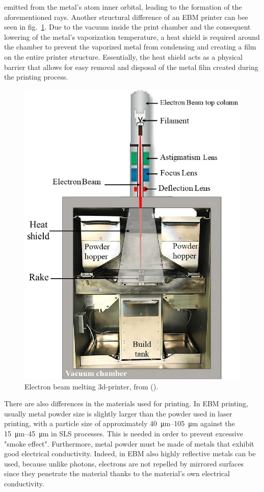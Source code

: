 emitted from the metal's atom inner orbital, leading to the formation of the aforementioned rays. Another structural difference of an EBM printer can bee seen in fig.~\ref{fig:ebm_printer}. Due to the vacuum inside the print chamber and the consequent lowering of the metal's vaporization temperature, a heat shield is required around the chamber to prevent the vaporized metal from condensing and creating a film on the entire printer structure. Essentially, the heat shield acts as a physical barrier that allows for easy removal and disposal of the metal film created during the printing process.
\begin{figure}[H]
    \centering
    \includegraphics[scale=0.3]{Images/A-schematic-of-electron-beam-melting-EBM.png}
    \caption[EBM 3d-printer.]{Electron beam melting 3d-printer, from        \citeauthor{azam_-depth_2018} (\citeyear{azam_-depth_2018}).}
    \label{fig:ebm_printer}
\end{figure}
 There are also differences in the materials used for printing. In EBM printing, usually metal powder size is slightly larger than the powder used in laser printing, with a particle size of approximately \SIrange[range-phrase = --]{40}{105}{\micro\meter} against the \SIrange[range-phrase = --]{15}{45}{\micro\meter} in SLS processes. This is needed in order to prevent excessive "smoke effect". Furthermore, metal powder must be made of metals that exhibit good electrical conductivity. Indeed, in EBM also highly reflective metals can be used, because unlike photons, electrons are not repelled by mirrored surfaces since they penetrate the material thanks to the material's own electrical conductivity.

